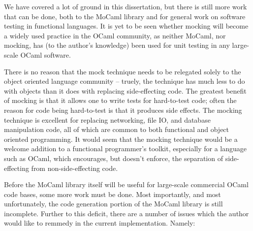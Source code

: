 
We have covered a lot of ground in this dissertation, but there is
still more work that can be done, both to the MoCaml library and for
general work on software testing in functional languages. It is yet to
be seen whether mocking will become a widely used practice in the
OCaml community, as neither MoCaml, nor mocking, has (to the author's
knowledge) been used for unit testing in any large-scale OCaml
software.

There is no reason that the mock technique needs to be relegated
solely to the object oriented language community -- truely, the
technique has much less to do with objects than it does with replacing
side-effecting code. The greatest benefit of mocking is that it allows
one to write tests for hard-to-test code; often the reason for code
being hard-to-test is that it produces side effects. The mocking
technique is excellent for replacing networking, file IO, and database
manipulation code, all of which are common to both functional and
object oriented programming. It would seem that the mocking technique
would be a welcome addition to a functional programmer's toolkit,
especially for a language such as OCaml, which encourages, but doesn't
enforce, the separation of side-effecting from non-side-effecting
code.

Before the MoCaml library itself will be useful for large-scale
commercial OCaml code bases, some more work must be done. Most
importantly, and most unfortunately, the code generation portion of
the MoCaml library is still incomplete. Further to this deficit, there
are a number of issues which the author would like to remmedy in the
current implementation. Namely:


